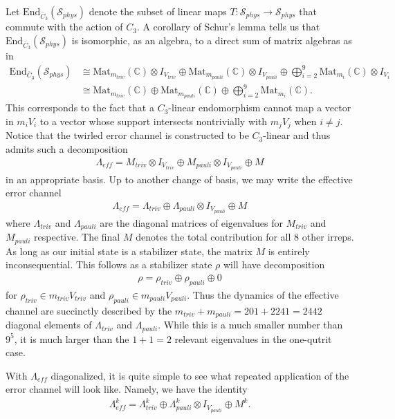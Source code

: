 Let $\mathrm{End}_{\bar{C}_3}(\mathcal{S}_{phys})$ denote the subset of linear maps $T : \mathcal{S}_{phys} \to \mathcal{S}_{phys}$ that commute with the action of $C_3$.
A corollary of Schur's lemma tells us that $\mathrm{End}_{\bar{C}_3}(\mathcal{S}_{phys})$ is isomorphic, as an algebra, to a direct sum of matrix algebras as in
\begin{align}
    \mathrm{End}_{\bar{C}_3}(\mathcal{S}_{phys}) &\cong \mathrm{Mat}_{m_{triv}}(\mathbb{C}) \otimes I_{V_{triv}} \oplus \mathrm{Mat}_{m_{pauli}}(\mathbb{C})\otimes I_{V_{pauli}} \oplus \bigoplus_{i = 2}^9 \mathrm{Mat}_{m_i} (\mathbb{C}) \otimes I_{V_i}\\
    &\cong \mathrm{Mat}_{m_{triv}}(\mathbb{C}) \oplus \mathrm{Mat}_{m_{pauli}}(\mathbb{C}) \oplus \bigoplus_{i = 2}^9 \mathrm{Mat}_{m_i}(\mathbb{C}) .
\end{align}
This corresponds to the fact that a $C_3$-linear endomorphism cannot map a vector in $m_i V_i$ to a vector whose support intersects nontrivially with $m_j V_j$ when $i \neq j$.
Notice that the twirled error channel is constructed to be $C_3$-linear and thus admits such a decomposition
\begin{align}
    \Lambda_{eff} = M_{triv}\otimes I_{V_{triv}} \oplus M_{pauli} \otimes I_{V_{pauli}} \oplus M
\end{align}
in an appropriate basis.
Up to another change of basis, we may write the effective error channel
\begin{align}
    \Lambda_{eff} = \Lambda_{triv} \oplus \Lambda_{pauli} \otimes I_{V_{pauli}} \oplus M
\end{align}
where $\Lambda_{triv}$ and $\Lambda_{pauli}$ are the diagonal matrices of eigenvalues for $M_{triv}$ and $M_{pauli}$ respective.
The final $M$ denotes the total contribution for all $8$ other irreps.
As long as our initial state is a stabilizer state, the matrix $M$ is entirely inconsequential.
This follows as a stabilizer state $\rho$ will have decomposition 
\begin{align}
    \rho = \rho_{triv} \oplus \rho_{pauli} \oplus 0
\end{align}
for $\rho_{triv} \in m_{triv} V_{triv}$ and $\rho_{pauli} \in m_{pauli}V_{pauli}$.
Thus the dynamics of the effective channel are succinctly described by the $m_{triv} + m_{pauli} = 201 + 2241 = 2442$ diagonal elements of $\Lambda_{triv}$ and $\Lambda_{pauli}$.
While this is a much smaller number than $9^5$, it is much larger than the $1 + 1 = 2$ relevant eigenvalues in the one-qutrit case.

With $\Lambda_{eff}$ diagonalized, it is quite simple to see what repeated application of the error channel will look like. Namely, we have the identity 
\begin{align}
    \Lambda_{eff}^k = \Lambda_{triv}^k \oplus \Lambda_{pauli}^k \otimes I_{V_{pauli}} \oplus M^k.
\end{align}




